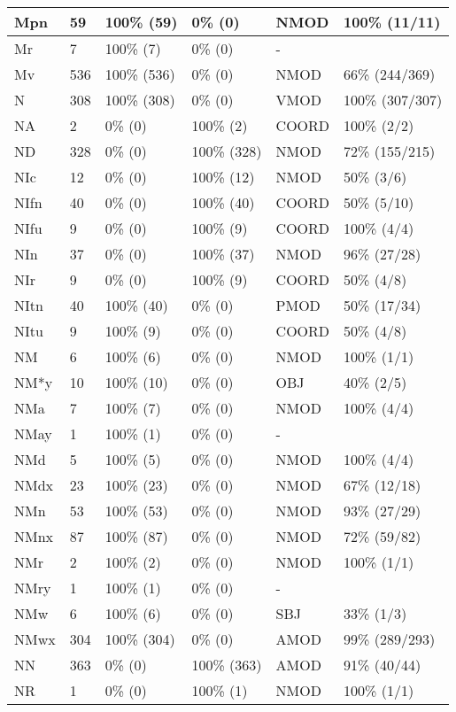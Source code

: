 \begin{figure*}
\begin{tabular}{|l|l|l|l||l|l|}
 Mpn & 59 & 100\% (59) & 0\% (0) & NMOD & 100\% (11/11) \\ 
\hline
 Mr & 7 & 100\% (7) & 0\% (0) & - &  \\ 
\hline
 Mv & 536 & 100\% (536) & 0\% (0) & NMOD & 66\% (244/369) \\ 
\hline
 N & 308 & 100\% (308) & 0\% (0) & VMOD & 100\% (307/307) \\ 
\hline
 NA & 2 & 0\% (0) & 100\% (2) & COORD & 100\% (2/2) \\ 
\hline
 ND & 328 & 0\% (0) & 100\% (328) & NMOD & 72\% (155/215) \\ 
\hline
 NIc & 12 & 0\% (0) & 100\% (12) & NMOD & 50\% (3/6) \\ 
\hline
 NIfn & 40 & 0\% (0) & 100\% (40) & COORD & 50\% (5/10) \\ 
\hline
 NIfu & 9 & 0\% (0) & 100\% (9) & COORD & 100\% (4/4) \\ 
\hline
 NIn & 37 & 0\% (0) & 100\% (37) & NMOD & 96\% (27/28) \\ 
\hline
 NIr & 9 & 0\% (0) & 100\% (9) & COORD & 50\% (4/8) \\ 
\hline
 NItn & 40 & 100\% (40) & 0\% (0) & PMOD & 50\% (17/34) \\ 
\hline
 NItu & 9 & 100\% (9) & 0\% (0) & COORD & 50\% (4/8) \\ 
\hline
 NM & 6 & 100\% (6) & 0\% (0) & NMOD & 100\% (1/1) \\ 
\hline
 NM*y & 10 & 100\% (10) & 0\% (0) & OBJ & 40\% (2/5) \\ 
\hline
 NMa & 7 & 100\% (7) & 0\% (0) & NMOD & 100\% (4/4) \\ 
\hline
 NMay & 1 & 100\% (1) & 0\% (0) & - &  \\ 
\hline
 NMd & 5 & 100\% (5) & 0\% (0) & NMOD & 100\% (4/4) \\ 
\hline
 NMdx & 23 & 100\% (23) & 0\% (0) & NMOD & 67\% (12/18) \\ 
\hline
 NMn & 53 & 100\% (53) & 0\% (0) & NMOD & 93\% (27/29) \\ 
\hline
 NMnx & 87 & 100\% (87) & 0\% (0) & NMOD & 72\% (59/82) \\ 
\hline
 NMr & 2 & 100\% (2) & 0\% (0) & NMOD & 100\% (1/1) \\ 
\hline
 NMry & 1 & 100\% (1) & 0\% (0) & - &  \\ 
\hline
 NMw & 6 & 100\% (6) & 0\% (0) & SBJ & 33\% (1/3) \\ 
\hline
 NMwx & 304 & 100\% (304) & 0\% (0) & AMOD & 99\% (289/293) \\ 
\hline
 NN & 363 & 0\% (0) & 100\% (363) & AMOD & 91\% (40/44) \\ 
\hline
 NR & 1 & 0\% (0) & 100\% (1) & NMOD & 100\% (1/1) \\ 
\hline
\end{tabular}
\end{figure*}
